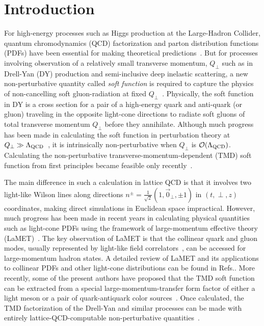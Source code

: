 \section{Introduction}
For high-energy processes such as Higgs production at the Large-Hadron Collider,
quantum chromodynamics (QCD) factorization and parton distribution functions (PDFs) have been
essential for making theoretical predictions~\cite{Ellis:1991qj,Lin:2017snn}.
%
But for processes involving observation of a relatively small transverse momentum, $Q_\perp$
such as in Drell-Yan (DY) production and semi-inclusive deep inelastic scattering,
a new non-perturbative quantity called {\it soft function} is required  to capture
the physics of non-cancelling soft gluon-radiation at fixed $Q_\perp$~\cite{Collins:1981uk,Collins:1984kg,Ji:2004wu,Ji:2004xq}.
%
Physically, the soft function in DY is a cross section for a pair of a high-energy
quark and anti-quark (or gluon) traveling in the opposite light-cone directions
to radiate soft gluons of total transverse momentum $Q_\perp$ before they annihilate.
Although much progress has been made in calculating the soft function in perturbation
theory at $Q_\perp\gg \Lambda_{\rm QCD}$~\cite{Echevarria:2015byo,Li:2016ctv}, it is intrinsically non-perturbative when $Q_\perp$
is ${\cal O}(\Lambda_{\rm QCD})$.  Calculating the non-perturbative transverse-momentum-dependent (TMD)
soft function from first principles became feasible only recently~\cite{Ji:2019sxk}.


The main difference in such a calculation  in lattice QCD
is that it involves two light-like Wilson lines along directions
$n^\pm=\frac{1}{\sqrt 2}(1,\vec 0_\perp,\pm 1)$ in $(t,\perp,z)$ coordinates, making
direct simulations in Euclidean space impractical.  However,
much progress has been made in recent years in calculating physical quantities such as
light-cone PDFs using the framework of large-momentum effective theory (LaMET)~\cite{Ji:2013dva,Ji:2014gla}.
The key observation of LaMET is that the collinear  quark and gluon modes,
usually represented by light-like field correlators~\cite{Collins:2011zzd,Bauer:2000yr,Bauer:2001ct,Bauer:2001yt}, can be
accessed for large-momentum hadron states. A detailed review of LaMET
and its applications to collinear PDFs and other light-cone distributions
can be found in Refs.\cite{Ji:2020ect,Cichy:2018mum}. More recently,
some of the present authors have proposed that the TMD soft function
can be extracted from a special large-momentum-transfer form factor of
either a light meson or a pair of quark-antiquark color sources~\cite{Ji:2019sxk}.
Once calculated, the TMD factorization of the Drell-Yan and similar processes
can be made with entirely lattice-QCD-computable non-perturbative quantities~\cite{Ji:2014hxa,Ji:2018hvs,Ebert:2018gzl,Ebert:2019okf,Ji:2019ewn,Vladimirov:2020ofp}.


